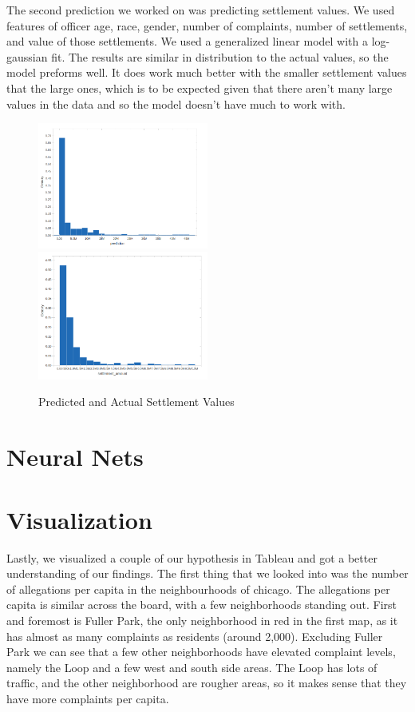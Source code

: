 \documentclass[11pt]{article}
\begin{document}
The second prediction we worked on was predicting settlement values. We used features of officer age, race, gender, number of complaints, number of settlements, and value of those settlements. We used a generalized linear model with a log-gaussian fit. The results are similar in distribution to the actual values, so the model preforms well. It does work much better with the smaller settlement values that the large ones, which is to be expected given that there aren't many large values in the data and so the model doesn't have much to work with.

\begin{figure}[h]
\caption{Predicted and Actual Settlement Values}
\includegraphics[width=0.5\textwidth]{predicted.png}
\includegraphics[width=0.5\textwidth]{actual2.png}
\end{figure}

\FloatBarrier
\section{Neural Nets}


\FloatBarrier
\section{Visualization}

Lastly, we visualized a couple of our hypothesis in Tableau and got a better understanding of our findings. The first thing that we looked into was the number of allegations per capita in the neighbourhoods of chicago. The allegations per capita is similar across the board, with a few neighborhoods standing out. First and foremost is Fuller Park, the only neighborhood in red in the first map, as it has almost as many complaints as residents (around 2,000). Excluding Fuller Park we can see that a few other neighborhoods have elevated complaint levels, namely the Loop and a few west and south side areas. The Loop has lots of traffic, and the other neighborhood are rougher areas, so it makes sense that they have more complaints per capita.
\end{document}
